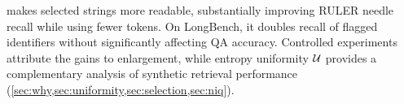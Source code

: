 
\name makes selected strings more readable, substantially improving RULER needle recall while using fewer tokens. On LongBench, it doubles recall of flagged identifiers without significantly affecting QA accuracy. Controlled experiments attribute the gains to enlargement, while entropy uniformity \(\mathcal{U}\) provides a complementary analysis of synthetic retrieval performance (\cref{sec:why,sec:uniformity,sec:selection,sec:niq}).


